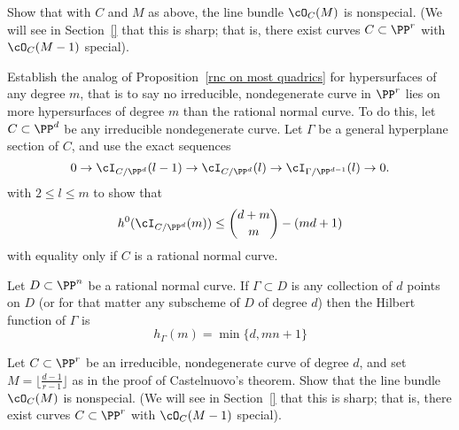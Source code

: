 \begin{exercise}
Show that with $C$ and $M$ as above, the line bundle $\cO_C(M)$ is nonspecial. (We will see in Section~\ref{} that this is sharp; that is, there exist curves $C \subset \PP^r$ with $\cO_C(M-1)$ special).
\end{exercise}

\begin{exercise}\label{extremal m-ics}
Establish the analog of Proposition~\ref{rnc on most quadrics} for hypersurfaces of any degree $m$, that is to say no irreducible, nondegenerate curve in $\PP^r$ lies on more hypersurfaces of degree $m$ than the rational normal curve.
To do this, let $C\subset \PP^d$ be any irreducible nondegenerate curve. Let $\Gamma$ be a general hyperplane section
of $C$, and use the exact sequences
$$
0 \to \cI_{C/\PP^d}(l-1) \to \cI_{C/\PP^d}(l) \to \cI_{\Gamma/\PP^{d-1}}(l) \to 0.
$$ 
with $2 \leq l \leq m$ to show that
$$
h^0(\cI_{C/\PP^d}(m)) \leq  \binom{d+m}{m} - (md+1)
$$
with equality only if $C$ is a rational normal curve.
\end{exercise}

\begin{exercise}\label{linear bound is sharp}
Let $D \subset \PP^n$ be a rational normal curve. If $\Gamma \subset D$ is any collection of $d$ points on $D$ (or for that matter any subscheme of $D$ of degree $d$) then the Hilbert function of $\Gamma$ is
$$
h_\Gamma(m) = \min\{d, mn+1\}
$$
\end{exercise} 

\begin{exercise}
Let $C \subset \PP^r$ be an irreducible, nondegenerate curve of degree $d$, and set $M = \lfloor{\frac{d-1}{r-1}}\rfloor$ as in the proof of Castelnuovo's theorem.
Show that the line bundle $\cO_C(M)$ is nonspecial. (We will see in Section~\ref{} that this is sharp; that is, there exist curves $C \subset \PP^r$ with $\cO_C(M-1)$ special).
\end{exercise}

